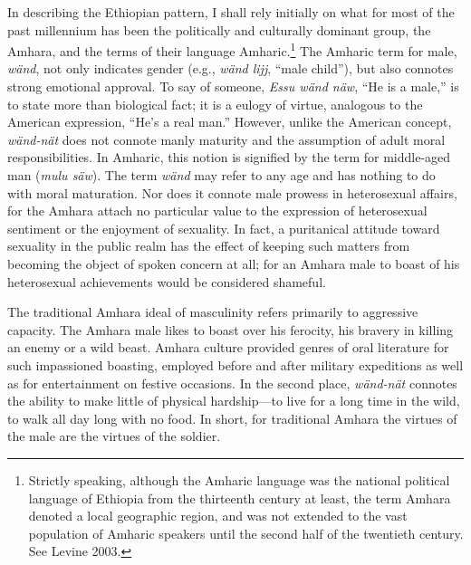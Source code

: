 In describing the Ethiopian pattern, I shall rely initially on what for most of the past millennium has been the politically and culturally dominant group, the Amhara, and the terms of their language Amharic.\footnote{Strictly speaking, although the Amharic language was the national political language of Ethiopia from the thirteenth century at least, the term Amhara denoted a local geographic region, and was not extended to the vast population of Amharic speakers until the second half of the twentieth century.  See Levine 2003.} The Amharic term for male, \emph{w\"{a}nd}, not only indicates gender (e.g., \emph{w\"{a}nd lijj}, ``male child''), but also connotes strong emotional approval. To say of someone, \emph{Essu w\"{a}nd n\"{a}w}, ``He is a male,'' is to state more than biological fact; it is a eulogy of virtue, analogous to the American expression, ``He's a real man.'' However, unlike the American concept, \emph{w\"{a}nd-n\"{a}t} does not connote manly maturity and the assumption of adult moral responsibilities. In Amharic, this notion is signified by the term for middle-aged man (\emph{mulu s\"{a}w}). The term \emph{w\"{a}nd} may refer to any age and has nothing to do with moral maturation. Nor does it connote male prowess in heterosexual affairs, for the Amhara attach no particular value to the expression of heterosexual sentiment or the enjoyment of sexuality. In fact, a puritanical attitude toward sexuality in the public realm has the effect of keeping such matters from becoming the object of spoken concern at all; for an Amhara male to boast of his heterosexual achievements would be considered shameful.

The traditional Amhara ideal of masculinity refers primarily to aggressive capacity. The Amhara male likes to boast over his ferocity, his bravery in killing an enemy or a wild beast. Amhara culture provided genres of oral literature for such impassioned boasting, employed before and after military expeditions as well as for entertainment on festive occasions. In the second place, \emph{w\"{a}nd-n\"{a}t} connotes the ability to make little of physical hardship---to live for a long time in the wild, to walk all day long with no food. In short, for traditional Amhara the virtues of the male are the virtues of the soldier.

